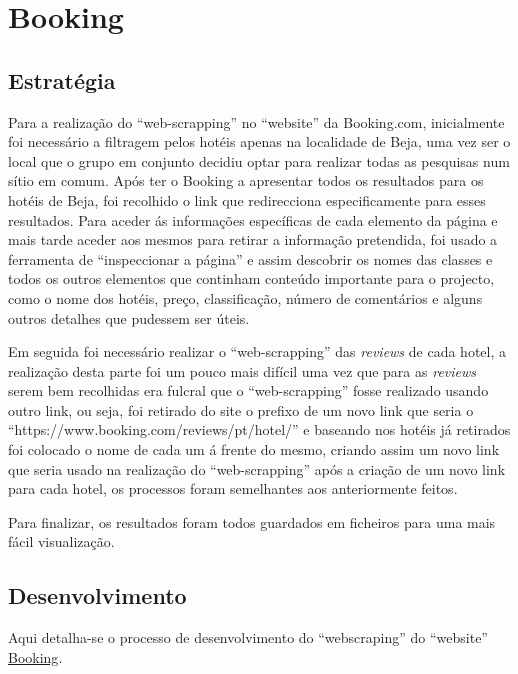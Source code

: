 \documentclass[a4paper,10pt]{article}
\begin{document}
\newpage

\section{Booking}

\subsection{Estratégia}

Para a realização do ``web-scrapping'' no ``website'' da Booking.com, inicialmente foi necessário a filtragem pelos hotéis apenas na localidade de Beja, uma vez ser o local que o grupo em conjunto decidiu optar para realizar todas as pesquisas num sítio em comum.
Após ter o Booking a apresentar todos os resultados para os hotéis de Beja, foi recolhido o link que redirecciona especificamente para esses resultados.
Para aceder ás informações específicas de cada elemento da página e mais tarde aceder aos mesmos para retirar a informação pretendida, foi usado a ferramenta de ``inspeccionar a página'' e assim descobrir os nomes das classes e todos os outros elementos que continham conteúdo importante para o projecto\cite{yt1}, como o nome dos hotéis, preço, classificação, número de comentários e alguns outros detalhes que pudessem ser úteis.

Em seguida foi necessário realizar o ``web-scrapping'' das \textit{reviews} de cada hotel, a realização desta parte foi um pouco mais difícil uma vez que para as \textit{reviews} serem bem recolhidas era fulcral que o ``web-scrapping'' fosse realizado usando outro link, ou seja, foi retirado do site o prefixo de um novo link que seria o ``https://www.booking.com/reviews/pt/hotel/'' e baseando nos hotéis já retirados foi colocado o nome de cada um á frente do mesmo, criando assim um novo link que seria usado na realização do ``web-scrapping'' após a criação de um novo link para cada hotel, os processos foram semelhantes aos anteriormente feitos.

Para finalizar, os resultados foram todos guardados em ficheiros  para uma mais fácil visualização.

\subsection{Desenvolvimento}

Aqui detalha-se o processo de desenvolvimento do ``webscraping'' do ``website'' \href{https://www.booking.com/country/pt.pt-pt.html}{Booking}.
\end{document}
